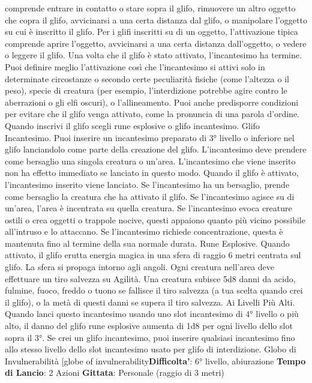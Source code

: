 \begin{multicols}{2}
comprende entrare in contatto o stare sopra il glifo,
rimuovere un altro oggetto che copra il glifo, avvicinarsi
a una certa distanza dal glifo, o manipolare l’oggetto su
cui è inscritto il glifo.
Per i glifi inscritti su di un oggetto, l’attivazione tipica
comprende aprire l’oggetto, avvicinarsi a una certa
distanza dall’oggetto, o vedere o leggere il glifo. Una
volta che il glifo è stato attivato, l’incantesimo ha
termine.
Puoi definire meglio l’attivazione così che l’incantesimo
si attivi solo in determinate circostanze o secondo certe
peculiarità fisiche (come l’altezza o il peso), specie di
creatura (per esempio, l’interdizione potrebbe agire
contro le aberrazioni o gli elfi oscuri), o l’allineamento.
Puoi anche predisporre condizioni per evitare che il glifo
venga attivato, come la pronuncia di una parola
d’ordine.
Quando inscrivi il glifo scegli rune esplosive o glifo
incantesimo.
Glifo Incantesimo. Puoi inserire un incantesimo
preparato di 3° livello o inferiore nel glifo lanciandolo
come parte della creazione del glifo. L’incantesimo
deve prendere come bersaglio una singola creatura o
un’area. L’incantesimo che viene inserito non ha effetto
immediato se lanciato in questo modo. Quando il glifo è
attivato, l’incantesimo inserito viene lanciato. Se
l’incantesimo ha un bersaglio, prende come bersaglio la
creatura che ha attivato il glifo. Se l’incantesimo agisce
su di un’area, l’area è incentrata su quella creatura. Se
l’incantesimo evoca creature ostili o crea oggetti o
trappole nocive, questi appaiono quanto più vicino
possibile all’intruso e lo attaccano. Se l’incantesimo
richiede concentrazione, questa è mantenuta fino al
termine della sua normale durata.
Rune Esplosive. Quando attivato, il glifo erutta energia
magica in una sfera di raggio 6 metri centrata sul glifo.
La sfera si propaga intorno agli angoli. Ogni creatura
nell’area deve effettuare un tiro salvezza su Agilità.
Una creatura subisce 5d8 danni da acido, fulmine,
fuoco, freddo o tuono se fallisce il tiro salvezza (a tua
scelta quando crei il glifo), o la metà di questi danni se
supera il tiro salvezza.
Ai Livelli Più Alti. Quando lanci questo incantesimo
usando uno slot incantesimo di 4° livello o più alto, il
danno del glifo rune esplosive aumenta di 1d8 per ogni
livello dello slot sopra il 3°. Se crei un glifo incantesimo,
puoi inserire qualsiasi incantesimo fino allo stesso
livello dello slot incantesimo usato per glifo di
interdizione.
Globo di Invulnerabilità
[globe of invulnerability\textbf{Difficolta'}:
6° livello, abiurazione
\textbf{Tempo di Lancio}: 2 Azioni
\textbf{Gittata}: Personale (raggio di 3 metri)

\end{multicols}
